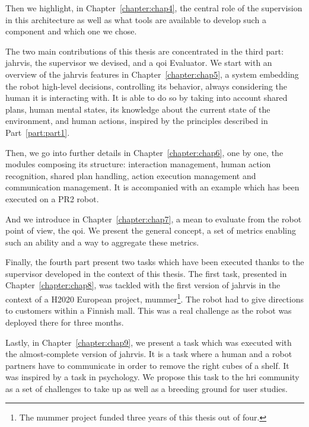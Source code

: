 \documentclass[a4paper,11pt,twoside]{StyleThese}
\begin{document}
Then we highlight, in Chapter~\ref{chapter:chap4}, the central role of the supervision in this architecture as well as what tools are available to develop such a component and which one we chose.

\bigskip

The two main contributions of this thesis are concentrated in the third part: \acrfull{jahrvis}, the supervisor we devised, and a \acrfull{qoi} Evaluator. We start with an overview of the \acrshort{jahrvis} features in Chapter~\ref{chapter:chap5}, \ie a system embedding the robot high-level decisions, controlling its behavior, always considering the human it is interacting with. It is able to do so by taking into account shared plans, human mental states, its knowledge about the current state of the environment, and human actions, inspired by the principles described in Part~\ref{part:part1}. 

Then, we go into further details in Chapter~\ref{chapter:chap6}, one by one, the modules composing its structure: interaction management, human action recognition, shared plan handling, action execution management and communication management. It is accompanied with an example which has been executed on a PR2 robot. 

And we introduce in Chapter~\ref{chapter:chap7}, a mean to evaluate from the robot point of view, the \acrlong{qoi}. We present the general concept, a set of metrics enabling such an ability and a way to aggregate these metrics. 

\bigskip

Finally, the fourth part present two tasks which have been executed thanks to the supervisor developed in the context of this thesis. The first task, presented in Chapter~\ref{chapter:chap8}, was tackled with the first version of \acrshort{jahrvis} in the context of a H2020 European project, \acrfull{mummer}\footnote{The \acrshort{mummer} project funded three years of this thesis out of four.}. The robot had to give directions to customers within a Finnish mall. This was a real challenge as the robot was deployed there for three months.

Lastly, in Chapter~\ref{chapter:chap9}, we present a task which was executed with the almost-complete version of \acrshort{jahrvis}. It is a task where a human and a robot partners have to communicate in order to remove the right cubes of a shelf. It was inspired by a task in psychology. We propose this task to the \acrshort{hri} community as a set of challenges to take up as well as a breeding ground for user studies.
\end{document}
